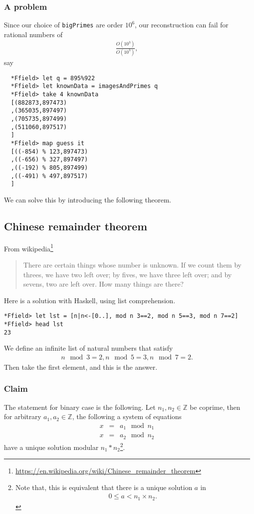 \documentclass[11pt]{book}
\begin{document}
\subsubsection{A problem}
Since our choice of \texttt{bigPrimes} are order $10^6$, our reconstruction can fail for rational numbers of
\begin{eqnarray}
\frac{O(10^3)}{O(10^3)},
\end{eqnarray}
say
\begin{verbatim}
  *Ffield> let q = 895%922
  *Ffield> let knownData = imagesAndPrimes q
  *Ffield> take 4 knownData 
  [(882873,897473)
  ,(365035,897497)
  ,(705735,897499)
  ,(511060,897517)
  ]
  *Ffield> map guess it
  [((-854) % 123,897473)
  ,((-656) % 327,897497)
  ,((-192) % 805,897499)
  ,((-491) % 497,897517)
  ]
\end{verbatim}
We can solve this by introducing the following theorem.

\subsection{Chinese remainder theorem}
From wikipedia\footnote{
\url{https://en.wikipedia.org/wiki/Chinese_remainder_theorem}
}
\begin{quotation}
There are certain things whose number is unknown. If we count them by threes, we have two left over; by fives, we have three left over; and by sevens, two are left over. How many things are there? 
\end{quotation}
Here is a solution with Haskell, using list comprehension.
\begin{verbatim}
*Ffield> let lst = [n|n<-[0..], mod n 3==2, mod n 5==3, mod n 7==2]
*Ffield> head lst
23
\end{verbatim}
We define an infinite list of natural numbers that satisfy
\begin{eqnarray}
n \mod 3 = 2, n \mod 5 = 3, n \mod 7 = 2.
\end{eqnarray}
Then take the first element, and this is the answer.

\subsubsection{Claim}
The statement for binary case is the following.
Let $n_1, n_2 \in \mathbb{Z}$ be coprime, then for arbitrary $a_1,a_2 \in \mathbb{Z}$, the following a system of equations
\begin{eqnarray}
x &=& a_1 \mod n_1\\
x &=& a_2 \mod n_2
\end{eqnarray}
have a unique solution modular $n_1*n_2$\footnote{
Note that, this is equivalent that there is a unique solution $a$ in
\begin{eqnarray}
0 \leq a < n_1\times n_2.
\end{eqnarray}
}.
\end{document}
